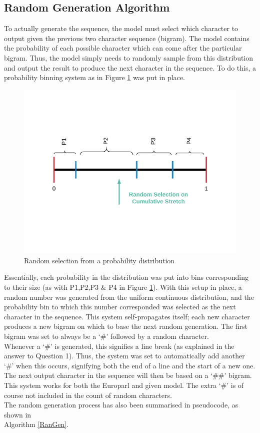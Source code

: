 \documentclass[12pt]{article}
\begin{document}
\subsection{Random Generation Algorithm}
To actually generate the sequence, the model must select which character to output given the previous two character sequence (bigram).  The model contains the probability of each possible character which can come after the particular bigram.  Thus, the model simply needs to randomly sample from this distribution and output the result to produce the next character in the sequence.  To do this, a probability binning system as in Figure \ref{fig:randomgen} was put in place.
\begin{figure}[H]
	\centering
	\includegraphics[width=0.7\linewidth]{graphics/Random_Gen}
	\caption{Random selection from a probability distribution}
	\label{fig:randomgen}
\end{figure}
Essentially, each probability in the distribution was put into bins corresponding to their size (as with P1,P2,P3 \& P4 in Figure \ref{fig:randomgen}).  With this setup in place, a random number was generated from the uniform continuous distribution, and the probability bin to which this number corresponded was selected as the next character in the sequence.  This system self-propagates itself; each new character produces a new bigram on which to base the next random generation.  The first bigram was set to always be a `\#' followed by a random character.\\
\hfill\break
Whenever a `\#' is generated, this signifies a line break (as explained in the answer to Question 1).  Thus, the system was set to automatically add another `\#' when this occurs, signifying both the end of a line and the start of a new one.  The next output character in the sequence will then be based on a `\#\#' bigram.  This system works for both the Europarl and given model.  The extra `\#' is of course not included in the count of random characters.\\
\hfill\break
The random generation process has also been summarised in pseudocode, as shown in \\Algorithm \ref{RanGen}.
\end{document}
